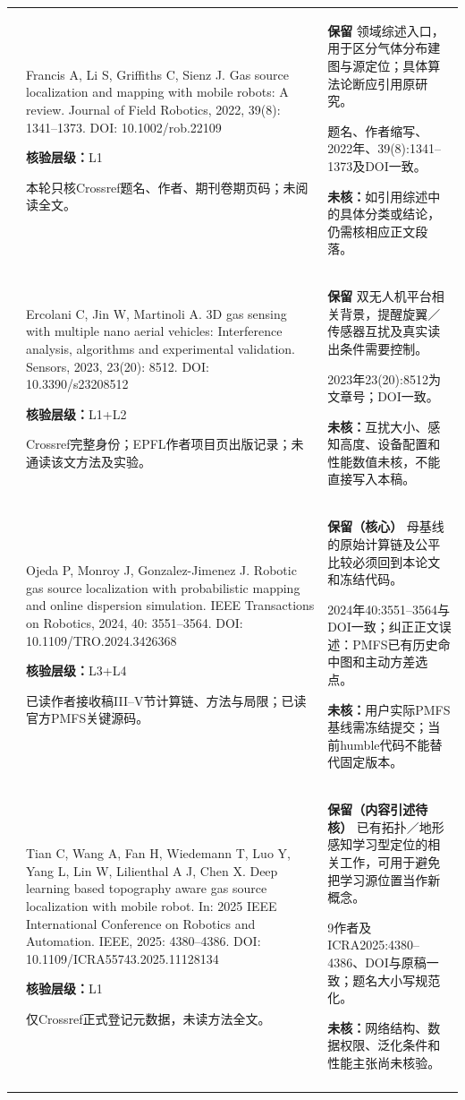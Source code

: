 \begin{longtable}{@{}>{\raggedright\arraybackslash}p{0.7cm}>{\raggedright\arraybackslash}p{7.0cm}>{\raggedright\arraybackslash}p{7.8cm}@{}}
1 & Francis A, Li S, Griffiths C, Sienz J. Gas source localization and mapping with mobile robots: A review. Journal of Field Robotics, 2022, 39(8): 1341–1373. DOI: 10.1002/rob.22109\par\textbf{核验层级：}L1\par 本轮只核Crossref题名、作者、期刊卷期页码；未阅读全文。 & \textbf{保留} 领域综述入口，用于区分气体分布建图与源定位；具体算法论断应引用原研究。\par 题名、作者缩写、2022年、39(8):1341–1373及DOI一致。\par\textbf{未核：}如引用综述中的具体分类或结论，仍需核相应正文段落。 \\\addlinespace[6pt]
2 & Ercolani C, Jin W, Martinoli A. 3D gas sensing with multiple nano aerial vehicles: Interference analysis, algorithms and experimental validation. Sensors, 2023, 23(20): 8512. DOI: 10.3390/s23208512\par\textbf{核验层级：}L1+L2\par Crossref完整身份；EPFL作者项目页出版记录；未通读该文方法及实验。 & \textbf{保留} 双无人机平台相关背景，提醒旋翼／传感器互扰及真实读出条件需要控制。\par 2023年23(20):8512为文章号；DOI一致。\par\textbf{未核：}互扰大小、感知高度、设备配置和性能数值未核，不能直接写入本稿。 \\\addlinespace[6pt]
3 & Ojeda P, Monroy J, Gonzalez-Jimenez J. Robotic gas source localization with probabilistic mapping and online dispersion simulation. IEEE Transactions on Robotics, 2024, 40: 3551–3564. DOI: 10.1109/TRO.2024.3426368\par\textbf{核验层级：}L3+L4\par 已读作者接收稿III–V节计算链、方法与局限；已读官方PMFS关键源码。 & \textbf{保留（核心）} 母基线的原始计算链及公平比较必须回到本论文和冻结代码。\par 2024年40:3551–3564与DOI一致；纠正正文误述：PMFS已有历史命中图和主动方差选点。\par\textbf{未核：}用户实际PMFS基线需冻结提交；当前humble代码不能替代固定版本。 \\\addlinespace[6pt]
4 & Tian C, Wang A, Fan H, Wiedemann T, Luo Y, Yang L, Lin W, Lilienthal A J, Chen X. Deep learning based topography aware gas source localization with mobile robot. In: 2025 IEEE International Conference on Robotics and Automation. IEEE, 2025: 4380–4386. DOI: 10.1109/ICRA55743.2025.11128134\par\textbf{核验层级：}L1\par 仅Crossref正式登记元数据，未读方法全文。 & \textbf{保留（内容引述待核）} 已有拓扑／地形感知学习型定位的相关工作，可用于避免把学习源位置当作新概念。\par 9作者及ICRA2025:4380–4386、DOI与原稿一致；题名大小写规范化。\par\textbf{未核：}网络结构、数据权限、泛化条件和性能主张尚未核验。 \\\addlinespace[6pt]

\end{longtable}

